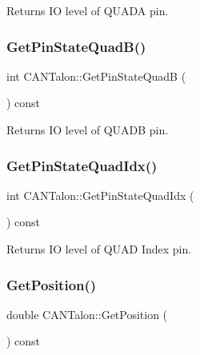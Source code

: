 \begin{DoxyReturn}{Returns}
IO level of Q\+U\+A\+DA pin. 
\end{DoxyReturn}
\mbox{\label{class_c_a_n_talon_a27ae4c2fc57e43d717fb0a38119b3106}} 
\subsubsection{\texorpdfstring{Get\+Pin\+State\+Quad\+B()}{GetPinStateQuadB()}}
{\footnotesize\ttfamily int C\+A\+N\+Talon\+::\+Get\+Pin\+State\+QuadB (\begin{DoxyParamCaption}{ }\end{DoxyParamCaption}) const}

\begin{DoxyReturn}{Returns}
IO level of Q\+U\+A\+DB pin. 
\end{DoxyReturn}
\mbox{\label{class_c_a_n_talon_ae532dd6728f896c9366e373853886760}} 
\subsubsection{\texorpdfstring{Get\+Pin\+State\+Quad\+Idx()}{GetPinStateQuadIdx()}}
{\footnotesize\ttfamily int C\+A\+N\+Talon\+::\+Get\+Pin\+State\+Quad\+Idx (\begin{DoxyParamCaption}{ }\end{DoxyParamCaption}) const}

\begin{DoxyReturn}{Returns}
IO level of Q\+U\+AD Index pin. 
\end{DoxyReturn}
\mbox{\label{class_c_a_n_talon_aedc47efb529bd41b55849e628363e661}} 
\subsubsection{\texorpdfstring{Get\+Position()}{GetPosition()}}
{\footnotesize\ttfamily double C\+A\+N\+Talon\+::\+Get\+Position (\begin{DoxyParamCaption}{ }\end{DoxyParamCaption}) const\hspace{0.3cm}{\ttfamily [override]}}

